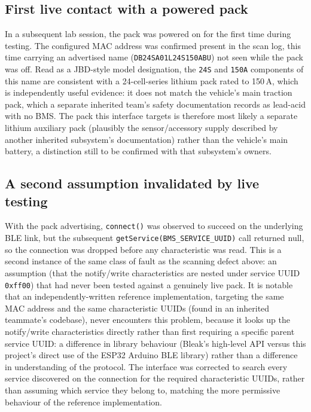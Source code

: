 \subsection{First live contact with a powered pack}

In a subsequent lab session, the pack was powered on for the first time during testing. The configured MAC address was confirmed present in the scan log, this time carrying an advertised name (\texttt{DB24SA01L24S150ABU}) not seen while the pack was off. Read as a JBD-style model designation, the \texttt{24S} and \texttt{150A} components of this name are consistent with a 24-cell-series lithium pack rated to 150\,A, which is independently useful evidence: it does not match the vehicle's main traction pack, which a separate inherited team's safety documentation records as lead-acid with no BMS. The pack this interface targets is therefore most likely a separate lithium auxiliary pack (plausibly the sensor/accessory supply described by another inherited subsystem's documentation) rather than the vehicle's main battery, a distinction still to be confirmed with that subsystem's owners.

\subsection{A second assumption invalidated by live testing}

With the pack advertising, \texttt{connect()} was observed to succeed on the underlying BLE link, but the subsequent \texttt{getService(BMS\_SERVICE\_UUID)} call returned null, so the connection was dropped before any characteristic was read. This is a second instance of the same class of fault as the scanning defect above: an assumption (that the notify/write characteristics are nested under service UUID \texttt{0xff00}) that had never been tested against a genuinely live pack. It is notable that an independently-written reference implementation, targeting the same MAC address and the same characteristic UUIDs (found in an inherited teammate's codebase), never encounters this problem, because it looks up the notify/write characteristics directly rather than first requiring a specific parent service UUID: a difference in library behaviour (Bleak's high-level API versus this project's direct use of the ESP32 Arduino BLE library) rather than a difference in understanding of the protocol. The interface was corrected to search every service discovered on the connection for the required characteristic UUIDs, rather than assuming which service they belong to, matching the more permissive behaviour of the reference implementation.

